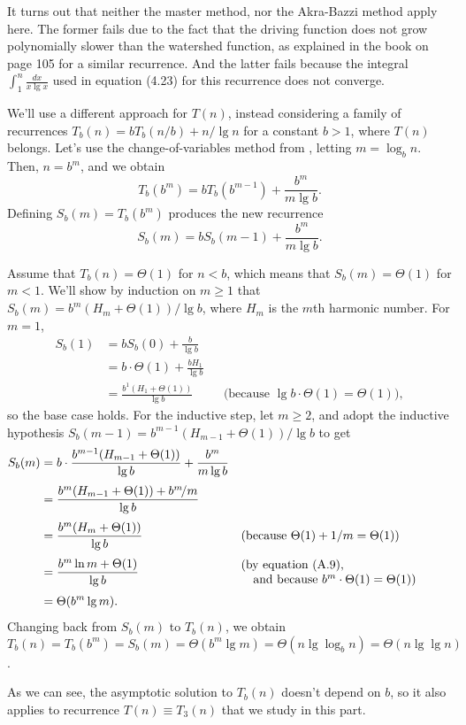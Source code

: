 It turns out that neither the master method, nor the Akra-Bazzi method apply here.
The former fails due to the fact that the driving function does not grow polynomially slower than the watershed function, as explained in the book on page 105 for a similar recurrence.
And the latter fails because the integral $\int_1^n\frac{dx}{x\lg x}$ used in equation (4.23) for this recurrence does not converge.

We'll use a different approach for $T(n)$, instead considering a family of recurrences $T_b(n)=bT_b(n/b)+n/\!\lg n$ for a constant $b>1$, where $T(n)$ belongs.
Let's use the change-of-variables method from , letting $m=\log_bn$.
Then, $n=b^m$, and we obtain
\[
    T_b(b^m) = bT_b(b^{m-1})+\frac{b^m}{m\lg b}.
\]
Defining $S_b(m)=T_b(b^m)$ produces the new recurrence
\[
    S_b(m) = bS_b(m-1)+\frac{b^m}{m\lg b}.
\]

Assume that $T_b(n)=\Theta(1)$ for $n<b$, which means that $S_b(m)=\Theta(1)$ for $m<1$.
We'll show by induction on $m\ge1$ that $S_b(m)=b^m(H_m+\Theta(1))/\lg b$, where $H_m$ is the $m$th harmonic number.
For $m=1$,
\begin{align*}
    S_b(1) &= bS_b(0)+\frac{b}{\lg b} \\[1mm]
    &= b\cdot\Theta(1)+\frac{bH_1}{\lg b} \\[1mm]
    &= \frac{b^1(H_1+\Theta(1))}{\lg b} && \text{(because $\lg b\cdot\Theta(1)=\Theta(1)$)},
\end{align*}
so the base case holds.
For the inductive step, let $m\ge2$, and adopt the inductive hypothesis $S_b(m-1)=b^{m-1}(H_{m-1}+\Theta(1))/\lg b$ to get
\begin{align*}
    S_b(m) &= b\cdot\frac{b^{m-1}(H_{m-1}+\Theta(1))}{\lg b}+\frac{b^m}{m\lg b} \\[1mm]
    &= \frac{b^m(H_{m-1}+\Theta(1))+b^m\!/m}{\lg b} \\[1mm]
    &= \frac{b^m(H_m+\Theta(1))}{\lg b} && \text{(because $\Theta(1)+1/m=\Theta(1)$)} \\[1mm]
    &= \frac{b^m\ln m+\Theta(1)}{\lg b} && \begin{minipage}{2.25in}(by equation (A.9),\\\null\quad and because $b^m\cdot\Theta(1)=\Theta(1)$)\end{minipage} \\[1mm]
    &= \Theta(b^m\lg m).
\end{align*}
Changing back from $S_b(m)$ to $T_b(n)$, we obtain $T_b(n)=T_b(b^m)=S_b(m)=\Theta(b^m\lg m)=\Theta(n\lg\log_b n)=\Theta(n\lg\lg n)$.

As we can see, the asymptotic solution to $T_b(n)$ doesn't depend on $b$, so it also applies to recurrence $T(n)\equiv T_3(n)$ that we study in this part.
